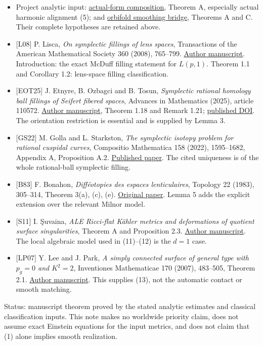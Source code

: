 \documentclass[
  11pt,
]{article}
\providecommand{\tightlist}{%
  \setlength{\itemsep}{0pt}\setlength{\parskip}{0pt}}
\begin{document}
\begin{itemize}
\tightlist
\item
  Project analytic input:
  \href{../mathematics/current/line1_composed_application.md}{actual-form
  composition}, Theorem A, especially actual harmonic alignment (5); and
  \href{20260924_orbifold_smoothing_bridge.md}{orbifold smoothing
  bridge}, Theorems A and C. Their complete hypotheses are retained
  above.
\item
  {[}L08{]} P. Lisca, \emph{On symplectic fillings of lens spaces},
  Transactions of the American Mathematical Society 360 (2008),
  765--799. \href{https://arxiv.org/html/math/0312354}{Author
  manuscript}. Introduction: the exact McDuff filling statement for
  \(L(p,1)\). Theorem 1.1 and Corollary 1.2: lens-space filling
  classification.
\item
  {[}EOT25{]} J. Etnyre, B. Ozbagci and B. Tosun, \emph{Symplectic
  rational homology ball fillings of Seifert fibered spaces}, Advances
  in Mathematics (2025), article 110572.
  \href{https://etnyre.math.gatech.edu/preprints/papers/sfsfillings.pdf}{Author
  manuscript}, Theorem 1.18 and Remark 1.21;
  \href{https://doi.org/10.1016/j.aim.2025.110572}{published DOI}. The
  orientation restriction is essential and is supplied by Lemma 3.
\item
  {[}GS22{]} M. Golla and L. Starkston, \emph{The symplectic isotopy
  problem for rational cuspidal curves}, Compositio Mathematica 158
  (2022), 1595--1682, Appendix A, Proposition A.2.
  \href{https://doi.org/10.1112/S0010437X2200762X}{Published paper}. The
  cited uniqueness is of the whole rational-ball symplectic filling.
\item
  {[}B83{]} F. Bonahon, \emph{Difféotopies des espaces lenticulaires},
  Topology 22 (1983), 305--314, Theorem 3(a), (c), (e).
  \href{https://www.maths.gla.ac.uk/~mpowell/Bonahon-diffeotopies-of-lens-spaces.pdf}{Original
  paper}. Lemma 5 adds the explicit extension over the relevant Milnor
  model.
\item
  {[}S11{]} I. Şuvaina, \emph{ALE Ricci-flat Kähler metrics and
  deformations of quotient surface singularities}, Theorem A and
  Proposition 2.3. \href{https://arxiv.org/html/1102.2672}{Author
  manuscript}. The local algebraic model used in (11)--(12) is the
  \(d=1\) case.
\item
  {[}LP07{]} Y. Lee and J. Park, \emph{A simply connected surface of
  general type with \(p_g=0\) and \(K^2=2\)}, Inventiones Mathematicae
  170 (2007), 483--505, Theorem 2.1.
  \href{https://arxiv.org/abs/math/0609072}{Author manuscript}. This
  supplies (13), not the automatic contact or smooth matching.
\end{itemize}

Status: manuscript theorem proved by the stated analytic estimates and
classical classification inputs. This note makes no worldwide priority
claim, does not assume exact Einstein equations for the input metrics,
and does not claim that (1) alone implies smooth realization.
\end{document}
